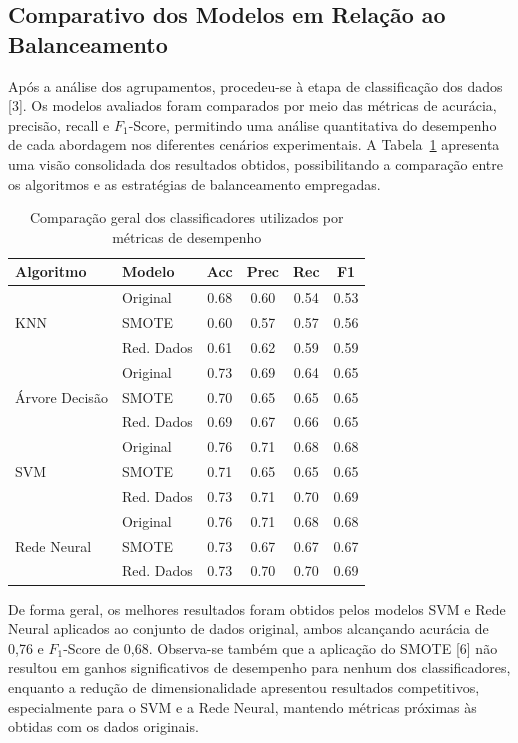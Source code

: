 \subsection{Comparativo dos Modelos em Relação ao Balanceamento}
Após a análise dos agrupamentos, procedeu-se à etapa de classificação dos dados [3]. Os modelos avaliados foram comparados por meio das métricas de acurácia, precisão, recall e $F_1$-Score, permitindo uma análise quantitativa do desempenho de cada abordagem nos diferentes cenários experimentais. A Tabela~\ref{tab:comparacao_classificadores} apresenta uma visão consolidada dos resultados obtidos, possibilitando a comparação entre os algoritmos e as estratégias de balanceamento empregadas.

\begin{table}[htbp]
\caption{Comparação geral dos classificadores utilizados por métricas de desempenho}
\label{tab:comparacao_classificadores}
\centering
\scriptsize
\begin{tabular}{llcccc}
\hline
\textbf{Algoritmo} & \textbf{Modelo} & \textbf{Acc} & \textbf{Prec} & \textbf{Rec} & \textbf{F1} \\
\hline
\multirow{3}{*}{KNN}
& Original   & 0.68 & 0.60 & 0.54 & 0.53 \\
& SMOTE      & 0.60 & 0.57 & 0.57 & 0.56 \\
& Red. Dados & 0.61 & 0.62 & 0.59 & 0.59 \\
\hline
\multirow{3}{*}{Árvore Decisão}
& Original   & 0.73 & 0.69 & 0.64 & 0.65 \\
& SMOTE      & 0.70 & 0.65 & 0.65 & 0.65 \\
& Red. Dados & 0.69 & 0.67 & 0.66 & 0.65 \\
\hline
\multirow{3}{*}{SVM}
& Original   & 0.76 & 0.71 & 0.68 & 0.68 \\
& SMOTE      & 0.71 & 0.65 & 0.65 & 0.65 \\
& Red. Dados & 0.73 & 0.71 & 0.70 & 0.69 \\
\hline
\multirow{3}{*}{Rede Neural}
& Original   & 0.76 & 0.71 & 0.68 & 0.68 \\
& SMOTE      & 0.73 & 0.67 & 0.67 & 0.67 \\
& Red. Dados & 0.73 & 0.70 & 0.70 & 0.69 \\
\hline
\end{tabular}
\end{table}

De forma geral, os melhores resultados foram obtidos pelos modelos SVM e Rede Neural aplicados ao conjunto de dados original, ambos alcançando acurácia de 0,76 e $F_1$-Score de 0,68. Observa-se também que a aplicação do SMOTE [6] não resultou em ganhos significativos de desempenho para nenhum dos classificadores, enquanto a redução de dimensionalidade apresentou resultados competitivos, especialmente para o SVM e a Rede Neural, mantendo métricas próximas às obtidas com os dados originais.

